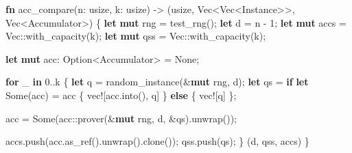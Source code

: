 \documentclass[
]{article}
\newenvironment{Shaded}{\begin{snugshade}}{\end{snugshade}}
\newcommand{\ConstantTok}[1]{\textcolor[rgb]{0.80,0.14,0.11}{#1}}
\newcommand{\ControlFlowTok}[1]{\textcolor[rgb]{0.80,0.14,0.11}{\textbf{#1}}}
\newcommand{\DataTypeTok}[1]{\textcolor[rgb]{0.71,0.46,0.08}{#1}}
\newcommand{\DecValTok}[1]{\textcolor[rgb]{0.56,0.25,0.44}{#1}}
\newcommand{\KeywordTok}[1]{\textcolor[rgb]{0.80,0.14,0.11}{\textbf{#1}}}
\newcommand{\NormalTok}[1]{\textcolor[rgb]{0.16,0.16,0.16}{#1}}
\newcommand{\OperatorTok}[1]{\textcolor[rgb]{0.56,0.25,0.44}{#1}}
\newcommand{\PreprocessorTok}[1]{\textcolor[rgb]{0.03,0.40,0.47}{#1}}
\begin{document}
\begin{Shaded}
\begin{Highlighting}[numbers=left,,]
  \KeywordTok{fn}\NormalTok{ acc\_compare(n}\OperatorTok{:} \DataTypeTok{usize}\OperatorTok{,}\NormalTok{ k}\OperatorTok{:} \DataTypeTok{usize}\NormalTok{) }\OperatorTok{{-}\textgreater{}}\NormalTok{ (}\DataTypeTok{usize}\OperatorTok{,} \DataTypeTok{Vec}\OperatorTok{\textless{}}\DataTypeTok{Vec}\OperatorTok{\textless{}}\NormalTok{Instance}\OperatorTok{\textgreater{}\textgreater{},} \DataTypeTok{Vec}\OperatorTok{\textless{}}\NormalTok{Accumulator}\OperatorTok{\textgreater{}}\NormalTok{) }\OperatorTok{\{}
      \KeywordTok{let} \KeywordTok{mut}\NormalTok{ rng }\OperatorTok{=}\NormalTok{ test\_rng()}\OperatorTok{;}
      \KeywordTok{let}\NormalTok{ d }\OperatorTok{=}\NormalTok{ n }\OperatorTok{{-}} \DecValTok{1}\OperatorTok{;}
      \KeywordTok{let} \KeywordTok{mut}\NormalTok{ accs }\OperatorTok{=} \DataTypeTok{Vec}\PreprocessorTok{::}\NormalTok{with\_capacity(k)}\OperatorTok{;}
      \KeywordTok{let} \KeywordTok{mut}\NormalTok{ qss }\OperatorTok{=} \DataTypeTok{Vec}\PreprocessorTok{::}\NormalTok{with\_capacity(k)}\OperatorTok{;}

      \KeywordTok{let} \KeywordTok{mut}\NormalTok{ acc}\OperatorTok{:} \DataTypeTok{Option}\OperatorTok{\textless{}}\NormalTok{Accumulator}\OperatorTok{\textgreater{}} \OperatorTok{=} \ConstantTok{None}\OperatorTok{;}

      \ControlFlowTok{for}\NormalTok{ \_ }\KeywordTok{in} \DecValTok{0}\OperatorTok{..}\NormalTok{k }\OperatorTok{\{}
          \KeywordTok{let}\NormalTok{ q }\OperatorTok{=}\NormalTok{ random\_instance(}\OperatorTok{\&}\KeywordTok{mut}\NormalTok{ rng}\OperatorTok{,}\NormalTok{ d)}\OperatorTok{;}
          \KeywordTok{let}\NormalTok{ qs }\OperatorTok{=} \ControlFlowTok{if} \KeywordTok{let} \ConstantTok{Some}\NormalTok{(acc) }\OperatorTok{=}\NormalTok{ acc }\OperatorTok{\{}
              \PreprocessorTok{vec!}\NormalTok{[acc}\OperatorTok{.}\NormalTok{into()}\OperatorTok{,}\NormalTok{ q]}
          \OperatorTok{\}} \ControlFlowTok{else} \OperatorTok{\{}
              \PreprocessorTok{vec!}\NormalTok{[q]}
          \OperatorTok{\};}

\NormalTok{          acc }\OperatorTok{=} \ConstantTok{Some}\NormalTok{(}\PreprocessorTok{acc::}\NormalTok{prover(}\OperatorTok{\&}\KeywordTok{mut}\NormalTok{ rng}\OperatorTok{,}\NormalTok{ d}\OperatorTok{,} \OperatorTok{\&}\NormalTok{qs)}\OperatorTok{.}\NormalTok{unwrap())}\OperatorTok{;}

\NormalTok{          accs}\OperatorTok{.}\NormalTok{push(acc}\OperatorTok{.}\NormalTok{as\_ref()}\OperatorTok{.}\NormalTok{unwrap()}\OperatorTok{.}\NormalTok{clone())}\OperatorTok{;}
\NormalTok{          qss}\OperatorTok{.}\NormalTok{push(qs)}\OperatorTok{;}
      \OperatorTok{\}}
\NormalTok{      (d}\OperatorTok{,}\NormalTok{ qss}\OperatorTok{,}\NormalTok{ accs)}
  \OperatorTok{\}}


\end{Highlighting}
\end{Shaded}
\end{document}
